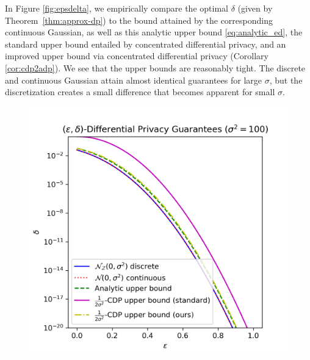 \documentclass{jpc}
\begin{document}
\noindent In Figure \ref{fig:epsdelta}, we empirically compare the optimal $\delta$ (given by Theorem~\ref{thm:approx-dp}) to  the bound attained by the corresponding continuous Gaussian, as well as this analytic upper bound \eqref{eq:analytic_ed}, the standard upper bound entailed by concentrated differential privacy, and an improved upper bound via concentrated differential privacy (Corollary \ref{cor:cdp2adp}). We see that the upper bounds are reasonably tight. The discrete and continuous Gaussian attain almost identical guarantees for large $\sigma$, but the discretization creates a small difference that becomes apparent for small $\sigma$.\begin{figure}[ht!]
    \centering
    \begin{minipage}{0.5\textwidth}
        \includegraphics[width=\textwidth]{dg_epsdelta.png}
    \end{minipage}
    \hspace{-10pt}
    \begin{minipage}{0.5\textwidth}

\end{minipage}
\end{figure}
\end{document}
